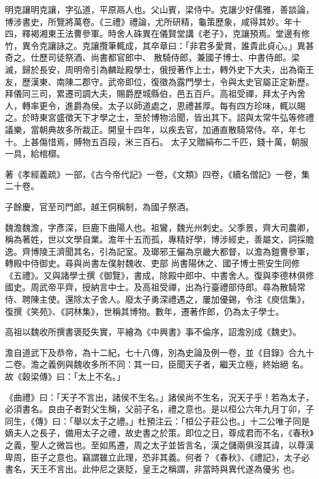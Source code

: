 
\begin{pinyinscope}

 明克讓明克讓，字弘道，平原鬲人也。父山賓，梁侍中。克讓少好儒雅，善談論，博涉書史，所覽將萬卷。《三禮》禮論，尤所研精，龜策歷象，咸得其妙。年十四，釋褐湘東王法曹參軍。時舍人硃異在儀賢堂講《老子》，克讓預焉。堂邊有修竹，異令克讓詠之。克讓攬筆輒成，其卒章曰：「非君多愛賞，誰貴此貞心。」異甚奇之。仕歷司徒祭酒、尚書都官郎中、
 散騎侍郎，兼國子博士、中書侍郎。梁滅，歸於長安，周明帝引為麟趾殿學士，俄授著作上士，轉外史下大夫，出為衛王友，歷漢東、南陳二郡守。武帝即位，復徵為露門學士，令與太史官屬正定新歷。拜儀同三司，累遷司調大夫，賜爵歷城縣伯，邑五百戶。高祖受禪，拜太子內舍人，轉率更令，進爵為侯。太子以師道處之，恩禮甚厚。每有四方珍味，輒以賜之。於時東宮盛徵天下才學之士，至於博物洽聞，皆出其下。詔與太常牛弘等修禮議樂，當朝典故多所裁正。開皇十四年，以疾去官，加通直散騎常侍。卒，年七十。上甚傷惜焉，賻物五百段，米三百石。
 太子又贈絹布二千匹，錢十萬，朝服一具，給棺槨。



 著《孝經義疏》一部，《古今帝代記》一卷，《文類》四卷，《續名僧記》一卷，集二十卷。



 子餘慶，官至司門郎。越王侗稱制，為國子祭酒。



 魏澹魏澹，字彥深，巨鹿下曲陽人也。祖鸞，魏光州刺史。父季景，齊大司農卿，稱為著姓，世以文學自業。澹年十五而孤，專精好學，博涉經史，善屬文，詞採贍逸。齊博陵王濟聞其名，引為記室。及瑯邪王儼為京畿大都督，以澹為鎧曹參軍，轉殿中侍御史。尋與尚書左僕射魏收、吏部
 尚書陽休之、國子博士熊安生同修《五禮》。又與諸學士撰《御覽》，書成，除殿中郎中、中書舍人。復與李德林俱修國史。周武帝平齊，授納言中士。及高祖受禪，出為行臺禮部侍郎。尋為散騎常侍、聘陳主使。還除太子舍人。廢太子勇深禮遇之，屢加優錫，令注《庾信集》，復撰《笑苑》、《詞林集》，世稱其博物。數年，遷著作郎，仍為太子學士。



 高祖以魏收所撰書褒貶失實，平繪為《中興書》事不倫序，詔澹別成《魏史》。



 澹自道武下及恭帝，為十二紀，七十八傳，別為史論及例一卷，並《目錄》合九十二卷。澹之義例與魏收多所不同：其一曰，臣聞天子者，繼天立極，終始絕
 名。故《穀梁傳》曰：「太上不名。」



 《曲禮》曰：「天子不言出，諸侯不生名。」諸侯尚不生名，況天子乎！若為太子，必須書名。良由子者對父生稱，父前子名，禮之意也。是以桓公六年九月丁卯，子同生，《傳》曰：「舉以太子之禮。」杜預注云：「桓公子莊公也。」十二公唯子同是嫡夫人之長子，備用太子之禮，故史書之於策。即位之日，尊成君而不名，《春秋》之義，聖人之微旨也。至如馬遷，周之太子並皆言名，漢之儲兩俱沒其諱，以尊漢卑周，臣子之意也。竊謂雖立此理，恐非其義。何者？《春秋》、《禮記》，太子必書名，天王不言出。此仲尼之褒貶，皇王之稱謂，非當時與異代遂為優劣
 也。




\end{pinyinscope}
